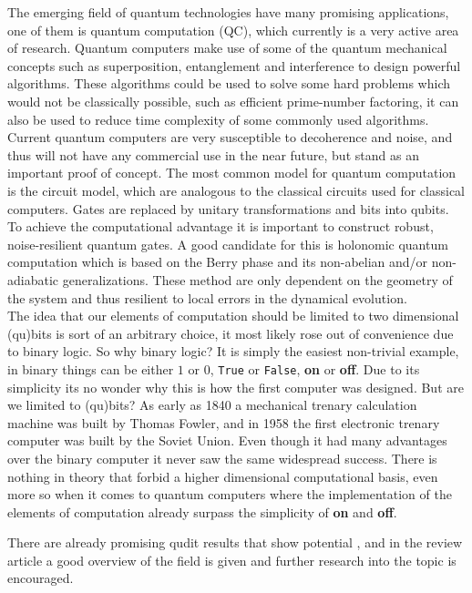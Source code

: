 The emerging field of quantum technologies have many promising applications, one of them is quantum computation (QC), which currently is a very active area of research. Quantum computers make use of some of the quantum mechanical concepts such as superposition, entanglement and interference to design powerful algorithms. These algorithms could be used to solve some hard problems which would not be classically possible, such as efficient prime-number factoring\cite{shor}, it can also be used to reduce time complexity of some commonly used algorithms\cite{Grover}. Current quantum computers are very susceptible to decoherence and noise, and thus will not have any commercial use in the near future, but stand as an important proof of concept. 
The most common model for quantum computation is the circuit model, which are analogous to the classical circuits used for classical computers. Gates are replaced by unitary transformations and bits into qubits. To achieve the computational advantage it is important to construct robust, noise-resilient quantum gates. A good candidate for this is holonomic quantum computation\cite{HQC,NHQC} which is based on the Berry phase\cite{berry} and its non-abelian and/or non-adiabatic generalizations\cite{anandan1,anandan2,zee}. These method are only dependent on the geometry of the system and thus resilient to local errors in the dynamical evolution.
\\
The idea that our elements of computation should be limited to two dimensional (qu)bits is sort of an arbitrary choice, it most likely rose out of convenience due to binary logic. So why binary logic? It is simply the easiest non-trivial example, in binary things can be either $1$ or $0$, {\tt True} or {\tt False}, \textbf{on} or \textbf{off}. Due to its simplicity its no wonder why this is how the first computer was designed. But are we limited to (qu)bits? As early as 1840 a mechanical trenary calculation machine was built by Thomas Fowler\cite{tricalc}, and in 1958 the first electronic trenary computer was built by the Soviet Union\cite{setun}. Even though it had many advantages over the binary computer it never saw the same widespread success. There is nothing in theory that forbid a higher dimensional computational basis, even more so when it comes to quantum computers where the implementation of the elements of computation already surpass the simplicity of \textbf{on} and \textbf{off}. 

There are already promising qudit results that show potential \cite{qutrit1,qudit2,qudit3}, and in the review article \cite{qudit} a good overview of the field is given and further research into the topic is encouraged.

